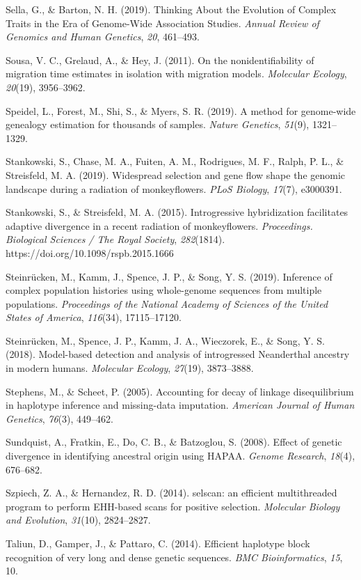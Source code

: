 \documentclass[twocolumn]{bmcart}%
\begin{document}
\begin{backmatter}
\begin{hangparas}{1em}{1}
Sella, G., \& Barton, N. H. (2019). Thinking About the Evolution of
Complex Traits in the Era of Genome-Wide Association Studies.
\emph{Annual Review of Genomics and Human Genetics}, \emph{20},
461--493.

Sousa, V. C., Grelaud, A., \& Hey, J. (2011). On the nonidentifiability
of migration time estimates in isolation with migration models.
\emph{Molecular Ecology}, \emph{20}(19), 3956--3962.

Speidel, L., Forest, M., Shi, S., \& Myers, S. R. (2019). A method for
genome-wide genealogy estimation for thousands of samples. \emph{Nature
Genetics}, \emph{51}(9), 1321--1329.

Stankowski, S., Chase, M. A., Fuiten, A. M., Rodrigues, M. F., Ralph, P.
L., \& Streisfeld, M. A. (2019). Widespread selection and gene flow
shape the genomic landscape during a radiation of monkeyflowers.
\emph{PLoS Biology}, \emph{17}(7), e3000391.

Stankowski, S., \& Streisfeld, M. A. (2015). Introgressive hybridization
facilitates adaptive divergence in a recent radiation of monkeyflowers.
\emph{Proceedings. Biological Sciences / The Royal Society},
\emph{282}(1814). https://doi.org/10.1098/rspb.2015.1666

Steinrücken, M., Kamm, J., Spence, J. P., \& Song, Y. S. (2019).
Inference of complex population histories using whole-genome sequences
from multiple populations. \emph{Proceedings of the National Academy of
Sciences of the United States of America}, \emph{116}(34), 17115--17120.

Steinrücken, M., Spence, J. P., Kamm, J. A., Wieczorek, E., \& Song, Y.
S. (2018). Model-based detection and analysis of introgressed
Neanderthal ancestry in modern humans. \emph{Molecular Ecology},
\emph{27}(19), 3873--3888.

Stephens, M., \& Scheet, P. (2005). Accounting for decay of linkage
disequilibrium in haplotype inference and missing-data imputation.
\emph{American Journal of Human Genetics}, \emph{76}(3), 449--462.

Sundquist, A., Fratkin, E., Do, C. B., \& Batzoglou, S. (2008). Effect
of genetic divergence in identifying ancestral origin using HAPAA.
\emph{Genome Research}, \emph{18}(4), 676--682.

Szpiech, Z. A., \& Hernandez, R. D. (2014). selscan: an efficient
multithreaded program to perform EHH-based scans for positive selection.
\emph{Molecular Biology and Evolution}, \emph{31}(10), 2824--2827.

Taliun, D., Gamper, J., \& Pattaro, C. (2014). Efficient haplotype block
recognition of very long and dense genetic sequences. \emph{BMC
Bioinformatics}, \emph{15}, 10.


\end{hangparas}
\end{backmatter}
\end{document}
